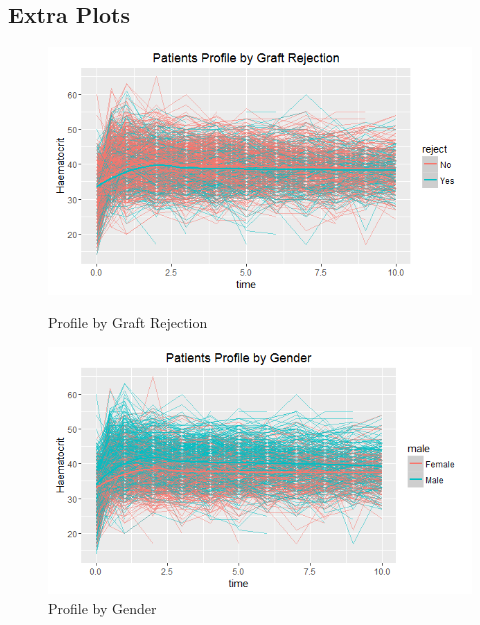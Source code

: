 \documentclass[11pt]{article}
\begin{document}
\subsection*{Extra Plots}
\begin{figure}[H]
\centering
\begin{minipage}{.4\textwidth}
\includegraphics[scale=0.5]{patientprofilegraftrejection.png}
\caption{Profile by Graft Rejection}
\end{minipage}
\begin{minipage}{.5\textwidth}
\includegraphics[scale=0.5]{patientsprofilegender.png}
\caption{Profile by Gender}
\end{minipage}
\end{figure}
\end{document}
